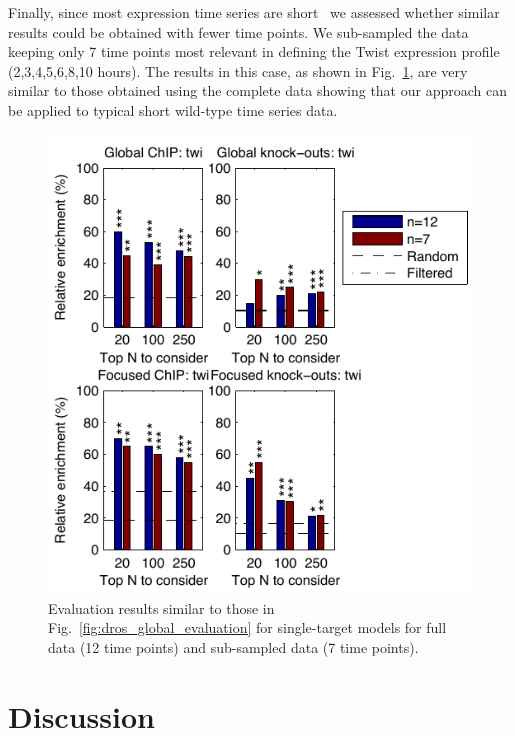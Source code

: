 \documentclass{pnastwo}
\begin{document}
\begin{article}
Finally, since most expression time series are short~\cite{Ernst2005}
we assessed whether similar results could be obtained with fewer time
points. We sub-sampled the data keeping only 7 time points most
relevant in defining the Twist expression profile
(2,3,4,5,6,8,10 hours). The results in this case, as shown in
Fig.~\ref{fig:dros_data_size_evaluation}, are very similar to 
those obtained using the complete data showing that 
our approach
can be applied to typical short wild-type time
series data.

\begin{figure}[tb]
  \centering
  \includegraphics{fig6}
  \caption{Evaluation results similar to those in 
    Fig.~\ref{fig:dros_global_evaluation}
    for single-target models
    for full data (12 time points) and sub-sampled data (7 time points).
    \label{fig:dros_data_size_evaluation}
  }
\end{figure}

\section{Discussion}


\end{article}
\end{document}
